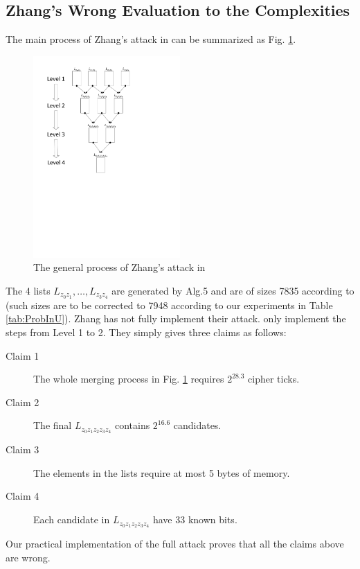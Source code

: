 \subsection{Zhang's Wrong Evaluation to the Complexities}
The main process of Zhang's attack in \cite{AC:Zhang19} can be summarized as Fig. \ref{fig:MergeZhang}.
\begin{figure}[htbp]
  \centering
  \includegraphics[width=0.5\textwidth]{pic/MergeZhang.pdf}
  \caption{The general process of Zhang's attack in \cite{AC:Zhang19}}\label{fig:MergeZhang}
\end{figure}
The 4 lists $L_{z_0z_1},\ldots, L_{z_3z_4}$ are generated by Alg.5 and are of sizes 7835 according to \cite{AC:Zhang19} (such sizes are to be corrected to 7948 according to our experiments in Table \ref{tab:ProbInU}).
Zhang has not fully implement their attack.
\cite{AC:Zhang19} only implement the steps from Level 1 to 2.
They simply gives three claims as follows:
\begin{description}
  \item[Claim 1] The whole merging process in Fig. \ref{fig:MergeZhang} requires $2^{28.3}$ cipher ticks.
  \item[Claim 2] The final $L_{z_0z_1z_2z_3z_4}$ contains $2^{16.6}$ candidates.
  \item[Claim 3] The elements in the lists require at most 5 bytes of memory.
  \item[Claim 4] Each candidate in $L_{z_0z_1z_2z_3z_4}$ have 33 known bits.
\end{description}
Our practical implementation of the full attack proves that all the claims above are wrong.

